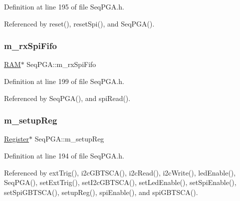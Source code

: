 Definition at line 195 of file Seq\+P\+G\+A.\+h.



Referenced by reset(), reset\+Spi(), and Seq\+P\+G\+A().

\mbox{\label{classSeqPGA_a8ebfe7863e10ab540b5ebecb7655a0d5}} 
\subsubsection{\texorpdfstring{m\+\_\+rx\+Spi\+Fifo}{m\_rxSpiFifo}}
{\footnotesize\ttfamily \hyperlink{classRAM}{R\+AM}$\ast$ Seq\+P\+G\+A\+::m\+\_\+rx\+Spi\+Fifo\hspace{0.3cm}{\ttfamily [private]}}



Definition at line 199 of file Seq\+P\+G\+A.\+h.



Referenced by Seq\+P\+G\+A(), and spi\+Read().

\mbox{\label{classSeqPGA_a03269241e7fc26493cd0595beda334c2}} 
\subsubsection{\texorpdfstring{m\+\_\+setup\+Reg}{m\_setupReg}}
{\footnotesize\ttfamily \hyperlink{classRegister}{Register}$\ast$ Seq\+P\+G\+A\+::m\+\_\+setup\+Reg\hspace{0.3cm}{\ttfamily [private]}}



Definition at line 194 of file Seq\+P\+G\+A.\+h.



Referenced by ext\+Trig(), i2c\+G\+B\+T\+S\+C\+A(), i2c\+Read(), i2c\+Write(), led\+Enable(), Seq\+P\+G\+A(), set\+Ext\+Trig(), set\+I2c\+G\+B\+T\+S\+C\+A(), set\+Led\+Enable(), set\+Spi\+Enable(), set\+Spi\+G\+B\+T\+S\+C\+A(), setup\+Reg(), spi\+Enable(), and spi\+G\+B\+T\+S\+C\+A().

\mbox{\label{classSeqPGA_afd5442d9b92f9b59bd553df9bd91dd87}} 
